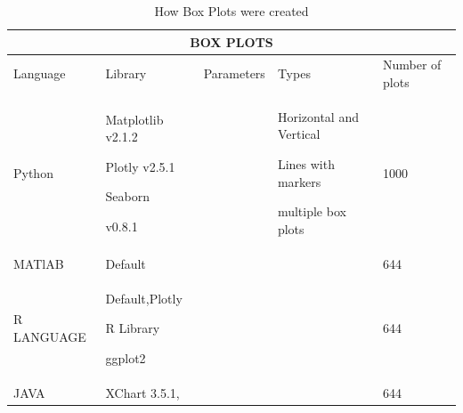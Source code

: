 \documentclass[12pt, a4paper,oneside]{report}
\begin{document}
\begin{table}[h]
	\centering {} \small
	
	\begin{tabular}{|p{3cm}|p{3cm}|p{3cm}|p{3cm}|p{3cm}|}
		
		\hline
		\multicolumn{5}{|c|}{BOX PLOTS} \\
		\hline
		
		Language & Library & Parameters &  Types & Number of plots\\ \hline
		
		Python  & Matplotlib v2.1.2 \par Plotly v2.5.1 \par Seaborn
		
		v0.8.1 &   &
		
		Horizontal and Vertical \par  Lines with markers \par multiple box plots  & 1000\\ \hline
		
		MATlAB   & Default &  &  &  644\\ \hline
		
		
		R LANGUAGE   & Default,Plotly \par R Library \par ggplot2 &  &  &  644\\ \hline
		
		JAVA   & XChart 3.5.1, &   &  &  644\\ \hline
		
	\end{tabular}
	
	\caption {How Box Plots were created}	\label{Table:1}
\end{table}
\end{document}
